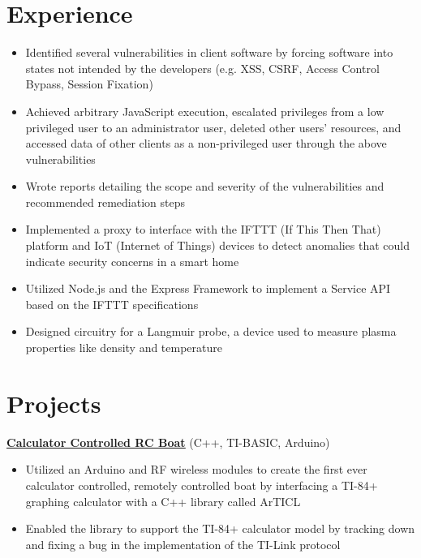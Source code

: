 \documentclass{article}
\begin{document}
\section{Experience}
\begin{itemize}
    \item Identified several vulnerabilities in client software by forcing software into states not intended by the developers (e.g. XSS, CSRF, Access Control Bypass, Session Fixation)
    \item Achieved arbitrary JavaScript execution, escalated privileges from a low privileged user to an administrator user, deleted other users' resources, and accessed data of other clients as a non-privileged user through the above vulnerabilities
    \item Wrote reports detailing the scope and severity of the vulnerabilities and recommended remediation steps

\end{itemize}
\begin{itemize}
    \item Implemented a proxy to interface with the IFTTT (If This Then That) platform and IoT (Internet of Things) devices to detect anomalies that could indicate security concerns in a smart home
    \item Utilized Node.js and the Express Framework to implement a Service API based on the IFTTT specifications
\end{itemize}
\begin{itemize}
    \item Designed circuitry for a Langmuir probe, a device used to measure plasma properties like density and temperature
\end{itemize}

\section{Projects}

\textbf{\href{https://github.com/jshin313/CalcControlledBoat}{\underline{Calculator Controlled RC Boat}}} \hfill (C++, TI-BASIC, Arduino)
\begin{itemize}
    \item Utilized an Arduino and RF wireless modules to create the first ever calculator controlled, remotely controlled boat by interfacing a TI-84+ graphing calculator with a C++ library called ArTICL
    \item Enabled the library to support the TI-84+ calculator model by tracking down and fixing a bug in the implementation of the TI-Link protocol
\end{itemize}
\end{document}
